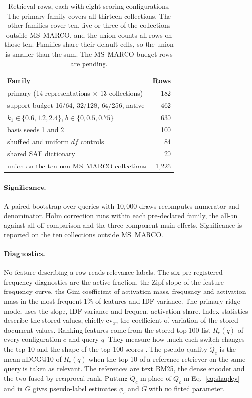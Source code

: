 \documentclass[11pt]{article}
\begin{document}
\begin{table}[t]
\centering
\small
\begin{tabular}{@{}lr@{}}
\toprule
Family & Rows \\
\midrule
primary (14 representations $\times$ 13 collections) & 182 \\
support budget 16/64, 32/128, 64/256, native & 462 \\
$k_1 \in \{0.6, 1.2, 2.4\}$, $b \in \{0, 0.5, 0.75\}$ & 630 \\
basis seeds 1 and 2 & 100 \\
shuffled and uniform $df$ controls & 84 \\
shared SAE dictionary & 20 \\
\midrule
union on the ten non-MS~MARCO collections & 1{,}226 \\
\bottomrule
\end{tabular}
\caption{Retrieval rows, each with eight scoring configurations. The primary family covers
all thirteen collections. The other families cover ten, five or three of the collections
outside MS~MARCO, and the union counts all rows on those ten.
Families share their default cells, so the union is smaller than the sum. The MS~MARCO budget rows are
pending.}
\label{tab:families}
\end{table}

\paragraph{Significance.} A paired bootstrap over queries with $10{,}000$ draws recomputes
numerator and denominator. Holm correction \citep{holm1979} runs within each pre-declared
family, the all-on against all-off comparison and the three component main effects.
Significance is reported on the ten collections outside MS~MARCO.

\paragraph{Diagnostics.} No feature describing a row reads relevance labels. The six
pre-registered frequency diagnostics are the active fraction, the Zipf slope of the
feature-frequency curve, the Gini coefficient of activation mass, frequency and
activation mass in the most frequent $1\%$ of features and IDF variance. The primary ridge
model uses the slope, IDF variance and frequent activation share. Index statistics
describe the stored values, chiefly $\mathrm{cv}_x$, the coefficient of variation of the
stored document values. Ranking features come from the stored top-100 list $R_c(q)$ of
every configuration $c$ and query $q$. They measure how much each switch changes the top 10
and the shape of the top-100 scores \citep{shtok2012nqc}. The pseudo-quality $\tilde{Q}_c$
is the mean nDCG@10 of $R_c(q)$ when the top 10 of a reference retriever on the same query
is taken as relevant. The references are text BM25, the dense encoder and the two fused by
reciprocal rank. Putting $\tilde{Q}_c$ in place of $Q_c$ in Eq.~\eqref{eq:shapley} and in
$G$ gives pseudo-label estimates $\tilde{\phi}_s$ and $\tilde{G}$ with no fitted parameter.
\end{document}
